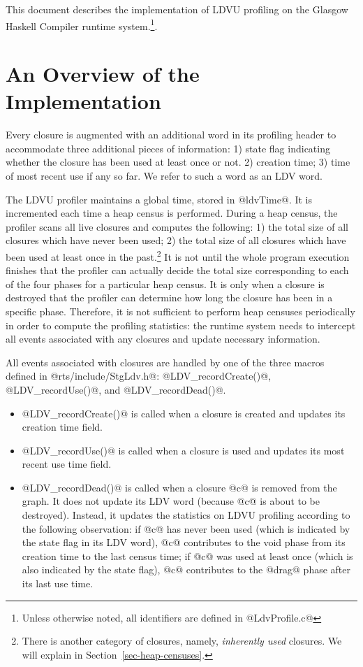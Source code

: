 \documentclass{article}
\begin{document}
This document describes the implementation of LDVU profiling on the Glasgow
Haskell Compiler runtime system.\footnote{Unless otherwise noted, all identifiers
are defined in @LdvProfile.c@}.

\section{An Overview of the Implementation}

Every closure is augmented with an additional word in its profiling header
to accommodate three additional pieces of information: 
1) state flag indicating whether the closure has been used at least once or not.
2) creation time; 3) time of most recent use if any so far.
We refer to such a word as an LDV word.

The LDVU profiler maintains a global time, stored in @ldvTime@.
It is incremented each time a heap census is performed.
During a heap census, the profiler scans all live closures and computes the 
following: 
1) the total size of all closures which have never been used; 
2) the total size of all closures which have been used at least once 
in the past.\footnote{There is another category of closures, namely, 
\emph{inherently used} closures. We will explain 
in Section~\ref{sec-heap-censuses}.}
It is not until the whole program execution finishes that the profiler 
can actually decide the total size corresponding to each of the four phases for
a particular heap census. It is only when a closure is destroyed that the profiler
can determine how long the closure has been in a specific phase. 
Therefore, it is not sufficient to perform heap censuses periodically in order to
compute the profiling statistics: the runtime system needs to intercept
all events associated with any closures and update necessary information.

All events associated with closures are handled by one of the three 
macros defined
in @rts/include/StgLdv.h@: @LDV_recordCreate()@, @LDV_recordUse()@, and 
@LDV_recordDead()@.

\begin{itemize}
\item{@LDV_recordCreate()@} is called when a closure is created and updates its 
creation time field.

\item{@LDV_recordUse()@} is called when a closure is used and updates its most recent
use time field.

\item{@LDV_recordDead()@} is called when a closure @c@ is removed from the graph.
It does not update its LDV word (because @c@ is about to be destroyed).
Instead, it updates the statistics on LDVU profiling according to the following
observation:
if @c@ has never been used (which is indicated by the state flag in its LDV 
word), 
@c@ contributes to the void phase from its creation time to the last census
time; if @c@ was used at least once (which is also indicated by the state flag),
@c@ contributes to the @drag@ phase after its last use time. 
\end{itemize}
\end{document}
